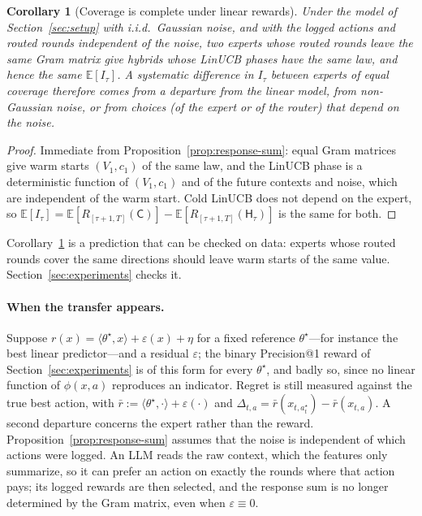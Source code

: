 \documentclass{article}
\newtheorem{corollary}{Corollary}
\theoremstyle{definition}
\theoremstyle{remark}
\newcommand{\E}{\mathbb{E}}
\theoremstyle{remark}
\newcommand{\Cold}{\mathsf{C}}
\newcommand{\Hyb}{\mathsf{H}}
\begin{document}
\begin{corollary}[Coverage is complete under linear rewards]
\label{cor:coverage-complete}
Under the model of Section~\ref{sec:setup} with i.i.d.\ Gaussian noise, and
with the logged actions and routed rounds independent of the noise, two
experts whose routed rounds leave the same Gram matrix give hybrids whose
LinUCB phases have the same law, and hence the same $\E[I_\tau]$. A systematic
difference in $I_\tau$ between experts of equal coverage therefore comes from
a departure from the linear model, from non-Gaussian noise, or from choices
(of the expert or of the router) that depend on the noise.
\end{corollary}

\begin{proof}
Immediate from Proposition~\ref{prop:response-sum}: equal Gram matrices give
warm starts $(V_1,c_1)$ of the same law, and the LinUCB phase is a
deterministic function of $(V_1,c_1)$ and of the future contexts and noise,
which are independent of the warm start. Cold LinUCB does not depend on the
expert, so $\E[I_\tau]=\E[R_{[\tau+1,T]}(\Cold)]-\E[R_{[\tau+1,T]}(\Hyb_\tau)]$
is the same for both.
\end{proof}

Corollary~\ref{cor:coverage-complete} is a prediction that can be checked on
data: experts whose routed rounds cover the same directions should leave
warm starts of the same value. Section~\ref{sec:experiments} checks it.

\paragraph{When the transfer appears.}
Suppose $r(x)=\langle\theta^\star,x\rangle+\varepsilon(x)+\eta$ for a fixed
reference $\theta^\star$---for instance the best linear predictor---and a
residual $\varepsilon$; the binary Precision@1 reward of
Section~\ref{sec:experiments} is of this form for every $\theta^\star$, and
badly so, since no linear function of $\phi(x,a)$ reproduces an indicator.
Regret is still measured against the true best action, with
$\bar r:=\langle\theta^\star,\cdot\rangle+\varepsilon(\cdot)$ and
$\Delta_{t,a}=\bar r(x_{t,a^\star_t})-\bar r(x_{t,a})$. A second departure concerns the expert
rather than the reward. Proposition~\ref{prop:response-sum} assumes that the
noise is independent of which actions were logged. An LLM reads the raw
context, which the features only summarize, so it can prefer an action on
exactly the rounds where that action pays; its logged rewards are then
selected, and the response sum is no longer determined by the Gram matrix,
even when $\varepsilon\equiv0$.
\end{document}
